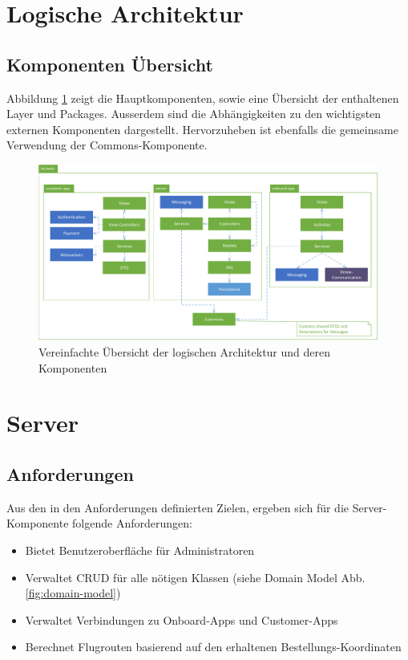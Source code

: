 \section{Logische Architektur}

\subsection{Komponenten Übersicht}

Abbildung \ref{fig:logical-architecture-overview} zeigt die Hauptkomponenten, sowie eine Übersicht der enthaltenen Layer und Packages. Ausserdem sind die Abhängigkeiten zu den wichtigsten externen Komponenten dargestellt. Hervorzuheben ist ebenfalls die gemeinsame Verwendung der Commons-Komponente. 

\begin{figure}[H]
	\includegraphics[width=1.0\textwidth]{images/logical-architecture-overview.pdf}
	\caption{Vereinfachte Übersicht der logischen Architektur und deren Komponenten }
	\label{fig:logical-architecture-overview}
\end{figure}

\section{Server}

\subsection{Anforderungen}
Aus den in den Anforderungen definierten Zielen, ergeben sich für die Server-Komponente folgende Anforderungen:

\begin{itemize}
	\item Bietet Benutzeroberfläche für Administratoren
	\item Verwaltet \Gls{CRUD} für alle nötigen Klassen (siehe Domain Model Abb. \ref{fig:domain-model})
	\item Verwaltet Verbindungen zu Onboard-Apps und Customer-Apps
	\item Berechnet Flugrouten basierend auf den erhaltenen Bestellungs-Koordinaten
\end{itemize}

